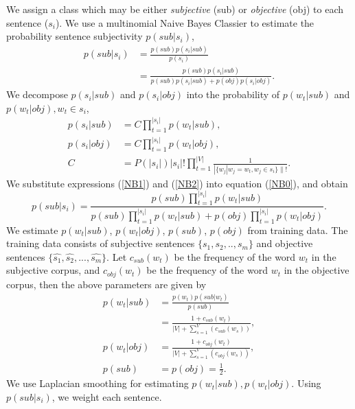 \documentclass[japanese]{jnlp_1.3d}
\begin{document}
We assign a class which may be either \textit{subjective} (sub) or \textit{objective} (obj) to each sentence ($s_i$).   We use a multinomial Naive Bayes Classier to estimate the probability sentence subjectivity $p(sub|s_i)$,
{\allowdisplaybreaks
\begin{align}
p(sub|s_i) & =  \frac{p(sub) p(s_i|sub)}{p(s_i)} 
	\nonumber \\
\label{NB0}
           & =  \frac{p(sub) p(s_i|sub)}{p(sub) p(s_i | sub) + p(obj)p(s_i| obj)}  .
\end{align}
We decompose $p(s_i|sub)$ and $p(s_i|obj)$ into the probability of $p(w_t|sub)$ and $p(w_t|obj), w_t \in s_i$,
\begin{align}
\label{NB1}
 p(s_i|sub) & =  C \prod_{t=1}^{|s_i|} p(w_t|sub), \\
\label{NB2}
p(s_i|obj) & =  C \prod_{t=1}^{|s_i|} p(w_t|obj),\\
C          & =  P(|s_i|)|s_i|! \prod_{t=1}^{|V|} \frac{1}{|\{w_j|w_j = w_t, w_j \in s_i\}\|!}.
\end{align}
}
We substitute expressions (\ref{NB1}) and (\ref{NB2}) into equation (\ref{NB0}), and obtain
\begin{equation}
 p(sub|s_i) = \frac{\displaystyle p(sub) \prod_{t=1}^{|s_i|} p(w_t|sub)}{\displaystyle p(sub) \prod_{t=1}^{|s_i|} p(w_t|sub) + p(obj) \prod_{t=1}^{|s_i|}p(w_t|obj)}.
\end{equation}
We estimate $p(w_t|sub)$, $p(w_t|obj)$, $p(sub)$, $p(obj)$ from  training data. 
The training data consists of subjective sentences $\{s_1,s_2,..,s_m\}$ and objective sentences $\{\hat{s_1},\hat{s_2},...,\hat{s_m}\}$. Let $c_{sub}(w_t)$ be the frequency of the word $w_t$ in the subjective corpus, and $c_{obj}(w_t)$ be the frequency of the word $w_t$ in the objective corpus, then the above parameters are given by 
\begin{align}
p(w_t|sub) & =  \frac{p(w_t)p(sub|w_t)}{p(sub)} \\
           & =  \frac{1 + c_{sub}(w_t)}{\displaystyle |V| + \sum_{s=1}^{V}(c_{sub}(w_s))}, \\
p(w_t|obj) & =  \frac{1 + c_{obj}(w_t)}{\displaystyle |V| + \sum_{s=1}^{V}(c_{obj}(w_s))},\\
p(sub)     & =  p(obj) = \frac{1}{2}.
\end{align}
We use Laplacian smoothing for estimating $p(w_t|sub),p(w_t|obj)$. Using $p(sub|s_i)$, we weight each sentence. 
\end{document}
